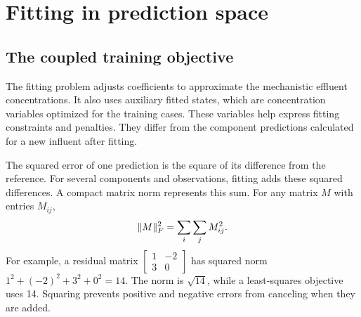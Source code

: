 \section{Fitting in prediction space}

\subsection{The coupled training objective}

The fitting problem adjusts coefficients to approximate the mechanistic effluent concentrations. It also uses auxiliary fitted states, which are concentration variables optimized for the training cases. These variables help express fitting constraints and penalties. They differ from the component predictions calculated for a new influent after fitting.

The squared error of one prediction is the square of its difference from the reference. For several components and observations, fitting adds these squared differences. A compact matrix norm represents this sum. For any matrix \(M\) with entries \(M_{ij}\),
\begin{equation}
\equationname{Squared Frobenius norm as a sum of coefficient squares}
\label{eq:icsor_frobenius_definition}
\|M\|_F^2=\sum_i\sum_j M_{ij}^2.
\end{equation}
For example, a residual matrix \(\begin{bmatrix}1&-2\\3&0\end{bmatrix}\) has squared norm \(1^2+(-2)^2+3^2+0^2=14\). The norm is \(\sqrt{14}\), while a least-squares objective uses 14. Squaring prevents positive and negative errors from canceling when they are added.

